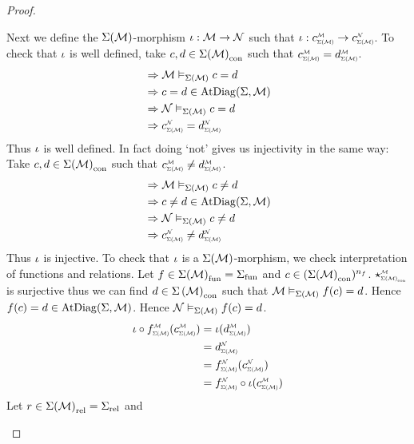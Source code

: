 \begin{proof}
\begin{forward}
        Next we define the $\Sigma(\mathcal{M})$-morphism 
        $\iota : \mathcal{M} \to \mathcal{N}$ such that 
        $\io : \subintp{\Si(\MM)}{\MM}{c} \to \subintp{\Si(\MM)}{\NN}{c}$.
        To check that $\iota$ is well defined, 
        take $c,d \in {\Sigma(\mathcal{M})}_\mathrm{con}$ such that 
        $\subintp{\Si(\MM)}{\MM}{c} = \subintp{\Si(\MM)}{\MM}{d}$.
        \begin{align*}
            &\implies \MM \model{\Si(\MM)} c = d \\
            &\implies c = d \in \atdiag{\Si}{\MM} \\
            &\implies \NN \model{\Si(\MM)} c = d \\
            &\implies \subintp{\Si(\MM)}{\NN}{c} = \subintp{\Si(\MM)}{\NN}{d}
        \end{align*}
        Thus $\iota$ is well defined.
        In fact doing `not' gives us injectivity in the same way:
        Take $c,d \in {\Sigma(\mathcal{M})}_\mathrm{con}$ such that 
        $\subintp{\Si(\MM)}{\MM}{c} \ne \subintp{\Si(\MM)}{\MM}{d}$.
        \begin{align*}
            &\implies \MM \model{\Si(\MM)} c \ne d \\
            &\implies c \ne d \in \atdiag{\Si}{\MM} \\
            &\implies \NN \model{\Si(\MM)} c \ne d \\
            &\implies \subintp{\Si(\MM)}{\NN}{c} \ne \subintp{\Si(\MM)}{\NN}{d}
        \end{align*}
        Thus $\iota$ is injective.
        To check that $\iota$ is a $\Sigma(\mathcal{M})$-morphism, 
        we check interpretation of functions and relations.
        Let $f \in {\Sigma(\mathcal{M})}_\mathrm{fun} = {\Sigma}_\mathrm{fun}$ and 
        $c \in ({\Sigma(\mathcal{M})}_\mathrm{con})^{n_f}$.
        $\intp{\const{\Si(\MM)}}{\MM}$ is surjective thus we can find 
        $d \in {\Sigma\left(\mathcal{M}\right)}_\mathrm{con}$ such that $\mathcal{M} \vDash_{\Sigma(\mathcal{M})} f(c) = d$.
        Hence $f(c) = d \in \mathrm{AtDiag}(\Sigma,\mathcal{M})$.
        Hence $\mathcal{N} \vDash_{\Sigma(\mathcal{M})} f(c) = d$.
        \begin{align*}
            \io \circ \subintp{\Si(\MM)}{\MM}{f}(\subintp{\Si(\MM)}{\MM}{c}) 
            &= \io(\subintp{\Si(\MM)}{\MM}{d}) \\
            &= \subintp{\Si(\MM)}{\NN}{d}\\
            &= \subintp{\Si(\MM)}{\NN}{f}(\subintp{\Si(\MM)}{\NN}{c})\\
            &= \subintp{\Si(\MM)}{\NN}{f} \circ \io(\subintp{\Si(\MM)}{\MM}{c})
        \end{align*}
        Let $r \in {\Sigma(\mathcal{M})}_\mathrm{rel} = {\Sigma}_\mathrm{rel}$ and 

\end{forward}
\end{proof}
